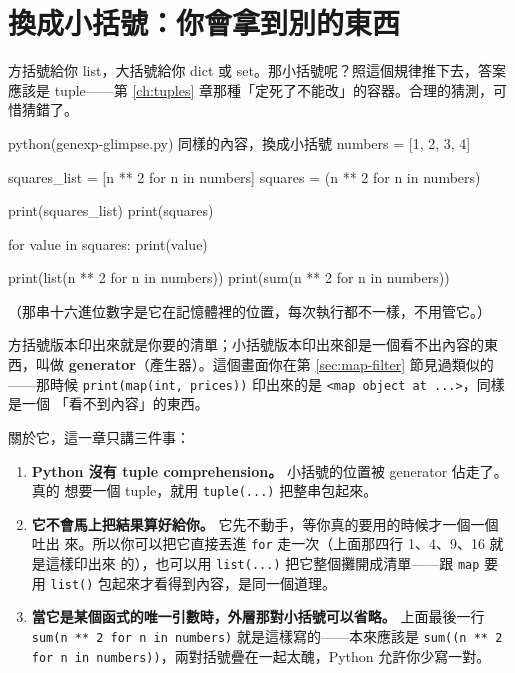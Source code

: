 \section{換成小括號：你會拿到別的東西}
\label{sec:genexp-glimpse}

方括號給你 list，大括號給你 dict 或 set。那小括號呢？照這個規律推下去，答案應該是
tuple——第 \ref{ch:tuples} 章那種「定死了不能改」的容器。合理的猜測，可惜猜錯了。

\begin{example}{python}{(genexp-glimpse.py) 同樣的內容，換成小括號}
numbers = [1, 2, 3, 4]

squares_list = [n ** 2 for n in numbers]
squares = (n ** 2 for n in numbers)

print(squares_list)
print(squares)

for value in squares:
    print(value)

print(list(n ** 2 for n in numbers))
print(sum(n ** 2 for n in numbers))
\end{example}


（那串十六進位數字是它在記憶體裡的位置，每次執行都不一樣，不用管它。）

方括號版本印出來就是你要的清單；小括號版本印出來卻是一個看不出內容的東西，叫做
\textbf{generator}（產生器）。這個畫面你在第 \ref{sec:map-filter} 節見過類似的——那時候
\texttt{print(map(int, prices))} 印出來的是 \texttt{<map object at ...>}，同樣是一個
「看不到內容」的東西。

關於它，這一章只講三件事：

\begin{enumerate}
\item \textbf{Python 沒有 tuple comprehension。} 小括號的位置被 generator 佔走了。真的
想要一個 tuple，就用 \texttt{tuple(...)} 把整串包起來。
\item \textbf{它不會馬上把結果算好給你。} 它先不動手，等你真的要用的時候才一個一個吐出
來。所以你可以把它直接丟進 \texttt{for} 走一次（上面那四行 1、4、9、16 就是這樣印出來
的），也可以用 \texttt{list(...)} 把它整個攤開成清單——跟 \texttt{map} 要用
\texttt{list()} 包起來才看得到內容，是同一個道理。
\item \textbf{當它是某個函式的唯一引數時，外層那對小括號可以省略。} 上面最後一行
\texttt{sum(n ** 2 for n in numbers)} 就是這樣寫的——本來應該是
\texttt{sum((n ** 2 for n in numbers))}，兩對括號疊在一起太醜，Python 允許你少寫一對。
\end{enumerate}

